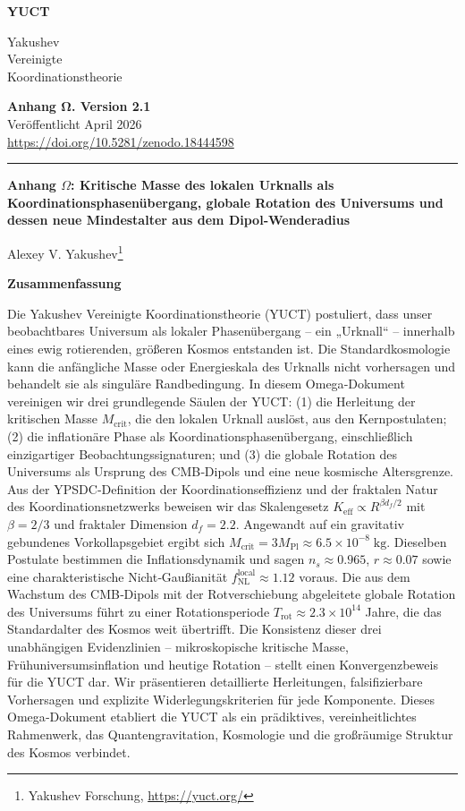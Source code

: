 \documentclass[11pt,a4paper]{article}
\newcommand{\Keff}{K_{\mathrm{eff}}}
\newcommand{\makeheader}{%
	\noindent
	\begin{minipage}{0.17\textwidth}
		\raggedright
		{\sffamily\bfseries\color{skyblue}\fontsize{46}{46}\selectfont YUCT}%
	\end{minipage}%
	\hspace{30pt}
	\begin{minipage}{0.32\textwidth}
		\raggedright
		{\sffamily\fontsize{11}{13}\selectfont Yakushev\\ Vereinigte\\ Koordinationstheorie}%
	\end{minipage}%
	\hfill
	\begin{minipage}{0.38\textwidth}
		\raggedleft
		{\sffamily\bfseries Anhang Ω. Version 2.1}\\
		{\sffamily Veröffentlicht April 2026}\\
		{\sffamily\footnotesize \url{https://doi.org/10.5281/zenodo.18444598}}%
	\end{minipage}
	\par\vspace{5pt}
	\noindent\textcolor{gold}{\rule{\textwidth}{1.6pt}}
	\par\vspace{0pt}
}
\begin{document}
	\renewcommand{\thepage}{\arabic{page}}
	\thispagestyle{firstpage}
	\makeheader
	
	\vspace{0cm}
	{\LARGE\bfseries Anhang \(\Omega\): Kritische Masse des lokalen Urknalls als Koordinationsphasenübergang, globale Rotation des Universums und dessen neue Mindestalter aus dem Dipol‑Wenderadius \par}
	\vspace{0.2cm}
	
	{\large Alexey V. Yakushev\footnote{Yakushev Forschung, \url{https://yuct.org/}}} \\
	\vspace{0.0cm}
	
	{\color{darkblue}\textbf{\LARGE Zusammenfassung}} \par
	{\large
		\noindent
		Die Yakushev Vereinigte Koordinationstheorie (YUCT) postuliert, dass unser beobachtbares Universum als lokaler Phasenübergang – ein „Urknall“ – innerhalb eines ewig rotierenden, größeren Kosmos entstanden ist. Die Standardkosmologie kann die anfängliche Masse oder Energieskala des Urknalls nicht vorhersagen und behandelt sie als singuläre Randbedingung. In diesem Omega‑Dokument vereinigen wir drei grundlegende Säulen der YUCT: (1) die Herleitung der kritischen Masse \(M_{\mathrm{crit}}\), die den lokalen Urknall auslöst, aus den Kernpostulaten; (2) die inflationäre Phase als Koordinationsphasenübergang, einschließlich einzigartiger Beobachtungssignaturen; und (3) die globale Rotation des Universums als Ursprung des CMB‑Dipols und eine neue kosmische Altersgrenze. Aus der YPSDC‑Definition der Koordinationseffizienz und der fraktalen Natur des Koordinationsnetzwerks beweisen wir das Skalengesetz \(\Keff \propto R^{\beta d_f/2}\) mit \(\beta = 2/3\) und fraktaler Dimension \(d_f = 2.2\). Angewandt auf ein gravitativ gebundenes Vorkollapsgebiet ergibt sich \(M_{\mathrm{crit}} = 3 M_{\mathrm{Pl}} \approx 6.5 \times 10^{-8}\;\text{kg}\). Dieselben Postulate bestimmen die Inflationsdynamik und sagen \(n_s \approx 0.965\), \(r \approx 0.07\) sowie eine charakteristische Nicht‑Gaußianität \(f_{\mathrm{NL}}^{\mathrm{local}} \approx 1.12\) voraus. Die aus dem Wachstum des CMB‑Dipols mit der Rotverschiebung abgeleitete globale Rotation des Universums führt zu einer Rotationsperiode \(T_{\mathrm{rot}} \approx 2.3 \times 10^{14}\) Jahre, die das Standardalter des Kosmos weit übertrifft. Die Konsistenz dieser drei unabhängigen Evidenzlinien – mikroskopische kritische Masse, Frühuniversumsinflation und heutige Rotation – stellt einen Konvergenzbeweis für die YUCT dar. Wir präsentieren detaillierte Herleitungen, falsifizierbare Vorhersagen und explizite Widerlegungskriterien für jede Komponente. Dieses Omega‑Dokument etabliert die YUCT als ein prädiktives, vereinheitlichtes Rahmenwerk, das Quantengravitation, Kosmologie und die großräumige Struktur des Kosmos verbindet.
	}
	
\end{document}
